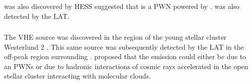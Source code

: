 \subsubsection{}

 was also discovered by \ac{HESS}
\citep{aharonian_2008a_very-high-energy-gamma-ray}
\cite{hessels_2008a_j18560245:-arecibo} suggested that 
is a \ac{PWN} powered by .   was also detected
by the \ac{LAT}.

\subsubsection{}

The \ac{VHE} source  was discovered in the region of the young
stellar cluster Westerlund 2 \cite{aharonian_2007a_detection-extended}.
This same source was subsequently detected by the \ac{LAT} in the off-peak
region surrounding  \citep{ackermann_2011a_fermi-lat-search}.
\cite{h.e.s.s.collaboration_2011a_revisiting-westerlund} proposed that
the emission could either be due to an \acp{PWN} or due to hadronic
interactions of cosmic rays accelerated in the open stellar cluster
interacting with molecular clouds.
